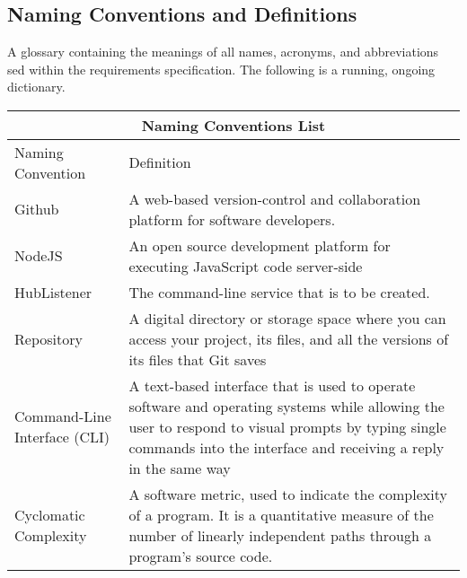\documentclass{article}
\begin{document}
\subsection{Naming Conventions and Definitions}

A glossary containing the meanings of all names, acronyms, and abbreviations sed within the requirements specification. The following is a running, ongoing dictionary. 
\newline
\begin{tabular}{ |p{6cm}||p{6cm}| }
\hline
\multicolumn{2}{|c|}{Naming Conventions List} \\
\hline
Naming Convention & Definition\\
\hline 
Github & A web-based version-control and collaboration platform for software developers. \\
\hline
NodeJS & An open source development platform for executing JavaScript code server-side \\
\hline
HubListener & The command-line service that is to be created.\\
\hline
Repository & A digital directory or storage space where you can access your project, its files, and all the versions of its files that Git saves\\
\hline
Command-Line Interface (CLI) & A text-based interface that is used to operate software and operating systems while allowing the user to respond to visual prompts by typing single commands into the interface and receiving a reply in the same way\\
\hline
Cyclomatic Complexity & A software metric, used to indicate the complexity of a program. It is a quantitative measure of the number of linearly independent paths through a program's source code.\\
\hline 
\end{tabular}
\end{document}
